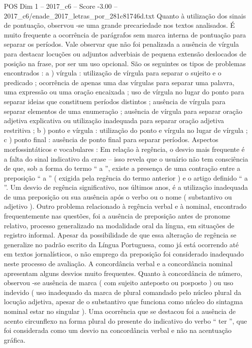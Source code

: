 \begin{textsample}{POS Dim 1 – 2017\_c6 – Score -3.00 – 2017\_c6/enade\_2017\_letras\_por\_281c81746d.txt}
Quanto à utilização dos sinais de pontuação, observou -se uma grande precariedade nos textos analisados.
É muito frequente a ocorrência de parágrafos sem marca interna de pontuação para separar os períodos.
Vale observar que não foi penalizada a ausência de vírgula para destacar locuções ou adjuntos adverbiais de pequena extensão deslocados de posição na frase, por ser um uso opcional.
São os seguintes os tipos de problemas encontrados : a ) vírgula : utilização de vírgula para separar o sujeito e o predicado ; ocorrência de apenas uma das vírgulas para separar uma palavra, uma expressão ou uma oração encaixada ; uso de vírgula no lugar do ponto para separar ideias que constituem períodos distintos ; ausência de vírgula para separar elementos de uma enumeração ; ausência de vírgula para separar oração adjetiva explicativa ou utilização inadequada para separar oração adjetiva restritiva ; b ) ponto e vírgula : utilização do ponto e vírgula no lugar de vírgula ; c ) ponto final : ausência de ponto final para separar períodos.
Aspectos morfossintáticos e vocabulares : Em relação à regência, o desvio mais frequente é a falta do sinal indicativo da crase – isso revela que o usuário não tem consciência de que, sob a forma do termo “ a ”, existe a presença de uma contração entre a preposição “ a ” ( exigida pela regência do termo anterior ) e o artigo definido “ a ”.
Um desvio de regência significativo, nos últimos anos, é a utilização inadequada de uma preposição ou sua ausência após o verbo ou o nome ( substantivo ou adjetivo ).
Outro problema relacionado à regência verbal e à nominal, encontrado frequentemente nas questões, foi a ausência de preposição antes de pronome relativo, processo generalizado na modalidade oral da língua, em situações de registro informal.
Apesar da possibilidade de que essa alteração de regência se generalize no padrão escrito da Língua Portuguesa, como já está ocorrendo até em textos jornalísticos, o não emprego da preposição foi considerado inadequado neste processo de avaliação.
A concordância verbal e a concordância nominal apresentam alguns desvios muito frequentes.
Quanto à concordância de número, observou -se ausência de marca ( com sujeito anteposto ou posposto ) ou uso indevido ( uso inadequado da marca de plural comandado pelo núcleo plural da locução adjetiva, apesar de o substantivo que funciona como núcleo do sintagma nominal estar no singular ).
Uma ocorrência que se destacou foi a ausência de acento circunflexo na forma plural do presente do indicativo do verbo “ ter ”, que foi considerada como um desvio na concordância verbal e não na acentuação gráfica.

\end{textsample}
